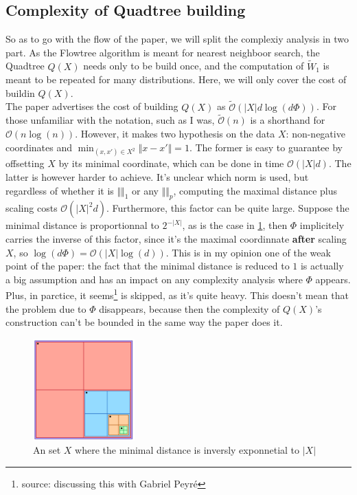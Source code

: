 \documentclass{article}
\begin{document}
\subsection{Complexity of Quadtree building}
So as to go with the flow of the paper, we will split the complexiy analysis in two part. As the Flowtree algorithm is meant for nearest neighboor search, the Quadtree $Q(X)$ needs only to be build once, and the computation of $\widetilde{W}_1$ is meant to be repeated for many distributions. Here, we will only cover the cost of buildin $Q(X)$.\\
The paper advertises the cost of building $Q(X)$ as $\widetilde{\mathcal{O}}(\vert X \vert d \log(d\Phi))$. For those unfamiliar with the notation, such as I was, $\widetilde{\mathcal{O}}(n)$ is a shorthand for $\mathcal{O}(n \log(n))$. However, it makes two hypothesis on the data $X$: non-negative coordinates and $\min_{(x, x') \in X^2} \Vert x - x' \Vert = 1$. The former is easy to guarantee by offsetting $X$ by its minimal coordinate, which can be done in time $\mathcal{O}(\vert X \vert d)$.  The latter is however harder to achieve. It's unclear which norm is used, but regardless of whether it is $\Vert \Vert_1$ or any $\Vert \Vert_p$, computing the maximal distance plus scaling costs $\mathcal{O}(\vert X \vert^2 d)$. Furthermore, this factor can be quite large. Suppose the minimal distance is proportionnal to $2^{-\vert X \vert}$, as is the case in \ref{worst_case_qb}, then $\Phi$ implicitely carries the inverse of this factor, since it's the maximal coordinnate \textbf{after} scaling $X$, so $\log(d\Phi) = \mathcal{O}(\vert X \vert \log(d))$. This is in my opinion one of the weak point of the paper: the fact that the minimal distance is reduced to $1$ is actually a big assumption and has an impact on any complexity analysis where $\Phi$ appears.\\
Plus, in parctice, it seems\footnote{source: discussing this with Gabriel Peyré} is skipped, as it's quite heavy. This doesn't mean that the problem due to $\Phi$ disappears, because then the complexity of $Q(X)$'s construction can't be bounded in the same way the paper does it.\\

\begin{figure}[h]
\centering
\includegraphics[width=0.35\textwidth]{imgs/worst_case_qb.png}
\caption{An set $X$ where the minimal distance is inversly exponnetial to $\vert X \vert$}
\label{worst_case_qb}
\end{figure}
\end{document}
